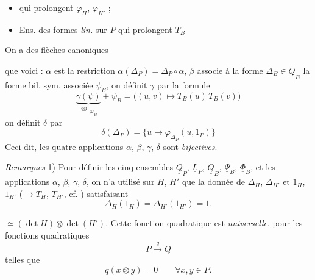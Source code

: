 \documentclass[11pt,a4paper]{article}
\begin{document}
\begin{itemize}
\item[] qui prolongent $\varphi_H$, $\varphi_{H'}$ ;
\item[$\underline{L}_P$ :] Ens. des formes \emph{lin.} sur $P$ qui prolongent $T_B$
\end{itemize}
On a des flèches canoniques


que voici : $\alpha$ est la restriction $\alpha(\Delta_P) = \Delta_P\circ\alpha$, $\beta$ associe à la forme $\Delta_B\in\underline{Q}_B$ la forme bil. sym. associée $\psi_B$, on définit $\gamma$ par la formule
\[ \underbrace{\gamma(\psi)}_{\overset{\text{déf}}{=}\ \varphi_B} + \psi_B = \bigl((u,v)\longmapsto T_B(u)\,T_B(v)\bigr) \]
on définit $\delta$ par
\[ \delta(\Delta_P) = \{ u \longmapsto \varphi_{\Delta_P}(u,1_P) \} \]
Ceci dit, les quatre applications $\alpha$, $\beta$, $\gamma$, $\delta$ sont \emph{bijectives}.

\emph{Remarques} 1) Pour définir les cinq ensembles $\underline{Q}_P$, $\underline{L}_P$, $\underline{Q}_B$, $\underline{\Psi}_B$, $\underline{\Phi}_B$, et les applications $\alpha$, $\beta$, $\gamma$, $\delta$, on n'a utilisé sur $H$, $H'$ que la donnée de $\Delta_H$, $\Delta_{H'}$ et $1_H$, $1_{H'}$ ($\to T_H$, $T_{H'}$, cf. \ill{}) satisfaisant
\[ \Delta_H(1_H) = \Delta_{H'}(1_{H'}) = 1 . \]

$\simeq (\det H)\otimes\det(H')$. Cette \struck{\ill{}} fonction quadratique est \emph{universelle}, pour les fonctions quadratiques
\[ P \xrightarrow{\ q\ } Q \]
telles que
\[ q(x\otimes y) = 0 \qquad \forall x,y \in P . \]
\end{document}
